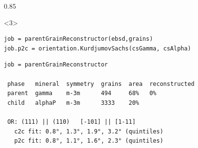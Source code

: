 \documentclass[compress,aspectratio=1610,fleqn,10pt]{beamer}
\begin{document}
\begin{frame}[fragile]
\begin{overlayarea}{\textwidth}{0.85\textheight}
    \begin{onlyenv}<3>
\begin{lstlisting}[style=input]
job = parentGrainReconstructor(ebsd,grains)
job.p2c = orientation.KurdjumovSachs(csGamma, csAlpha)
\end{lstlisting}
\begin{lstlisting}[style=output]
job = parentGrainReconstructor

 phase   mineral  symmetry  grains  area  reconstructed
 parent  gamma    m-3m      494     68%   0%
 child   alphaP   m-3m      3333    20%

 OR: (111) || (110)   [-101] || [1-11]
   c2c fit: 0.8°, 1.3°, 1.9°, 3.2° (quintiles)
   p2c fit: 0.8°, 1.1°, 1.6°, 2.3° (quintiles)
\end{lstlisting}
    \end{onlyenv}

  \end{overlayarea}

\end{frame}
\end{document}
